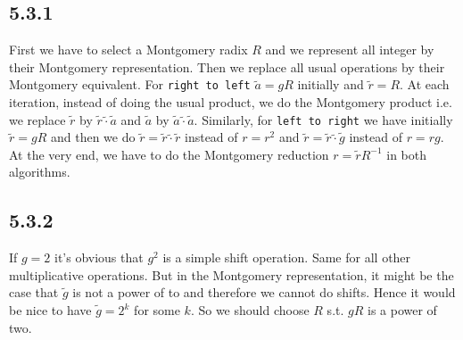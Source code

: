 \documentclass[12pt,a4paper]{article}
\newcommand {\mprod}{\tilde{\cdot}}
\begin{document}
    \subsection*{5.3.1}
    First we have to select a Montgomery radix $R$ and we represent all integer by their Montgomery representation.
    Then we replace all usual operations by their Montgomery equivalent.
    For \texttt{right to left} $\tilde{a} = gR$ initially and $\tilde{r} = R$. At each iteration, instead of doing the usual product, we do the Montgomery product
    i.e. we replace $\tilde{r}$ by $\tilde{r} \mprod \tilde{a}$ and $\tilde{a}$ by $\tilde{a} \mprod \tilde{a}$.
    Similarly, for \texttt{left to right} we have initially $\tilde{r} = gR$  and  then we do $\tilde{r} = \tilde{r} \mprod \tilde{r}$ 
    instead of $r = r^2$ and $\tilde{r} =  \tilde{r} \mprod \tilde{g}$ instead of $r = rg$.
    At the very end, we have to do the Montgomery reduction $r = \tilde{r}R^{-1}$ in both algorithms.
    \subsection*{5.3.2}
    If $g=2$ it's obvious that $g^2$ is a simple shift operation. Same for all other multiplicative operations.
    But in the Montgomery representation, it might be the case that $\tilde{g}$ is not a power of to and therefore we cannot do shifts.
    Hence it would be nice to have $\tilde{g} = 2^k$ for some $k$. So we should choose $R$ s.t. $gR$ is a power of two.
\end{document}
